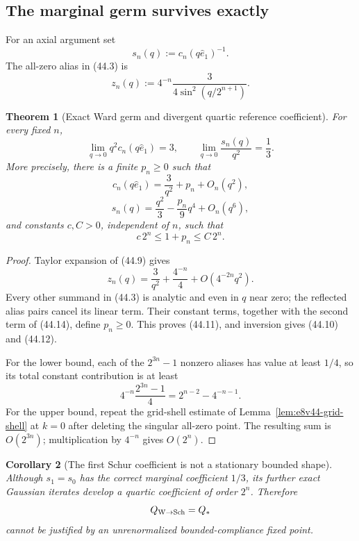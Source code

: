 \documentclass[11pt,oneside]{book}
\newtheorem{theorem}{Theorem}[chapter]
\newtheorem{corollary}[theorem]{Corollary}
\theoremstyle{definition}
\theoremstyle{remark}
\begin{document}
\subsection{The marginal germ survives exactly}

For an axial argument set
\[
 s_n(q):=c_n(q\widehat e_1)^{-1}.                               \tag{44.8}
\]
The all-zero alias in (44.3) is
\[
 z_n(q)
 :=4^{-n}\frac{3}{4\sin^2(q/2^{n+1})}.                         \tag{44.9}
\]

\begin{theorem}[Exact Ward germ and divergent quartic reference
coefficient]
\label{thm:e8v44-Ward-germ}
For every fixed \(n\),
\[
 \boxed{\lim_{q\to0}q^2c_n(q\widehat e_1)=3,\qquad
 \lim_{q\to0}\frac{s_n(q)}{q^2}=\frac13.}                       \tag{44.10}
\]
More precisely, there is a finite \(p_n\ge0\) such that
\[
 c_n(q\widehat e_1)=\frac3{q^2}+p_n+O_n(q^2),                  \tag{44.11}
\]
\[
 s_n(q)=\frac{q^2}{3}-\frac{p_n}{9}q^4+O_n(q^6),               \tag{44.12}
\]
and constants \(c,C>0\), independent of \(n\), such that
\[
 \boxed{c\,2^n\le1+p_n\le C\,2^n.}                             \tag{44.13}
\]
\end{theorem}

\begin{proof}
Taylor expansion of (44.9) gives
\[
 z_n(q)=\frac3{q^2}+\frac{4^{-n}}4+O(4^{-2n}q^2).               \tag{44.14}
\]
Every other summand in (44.3) is analytic and even in \(q\) near
zero; the reflected alias pairs cancel its linear term.  Their
constant terms, together with the second term of (44.14), define
\(p_n\ge0\).  This proves (44.11), and inversion gives
(44.10) and (44.12).

For the lower bound, each of the \(2^{3n}-1\) nonzero aliases has
value at least \(1/4\), so its total constant contribution is at
least
\[
 4^{-n}\frac{2^{3n}-1}{4}
 =2^{n-2}-4^{-n-1}.                                             \tag{44.15}
\]
For the upper bound, repeat the grid-shell estimate of
Lemma~\ref{lem:e8v44-grid-shell} at \(k=0\) after deleting the
singular all-zero point.  The resulting sum is \(O(2^{3n})\);
multiplication by \(4^{-n}\) gives \(O(2^n)\).
\end{proof}

\begin{corollary}[The first Schur coefficient is not a stationary
bounded shape]
\label{cor:e8v44-no-first-fixed}
Although \(s_1=s_0\) has the correct marginal coefficient \(1/3\),
its further exact Gaussian iterates develop a quartic coefficient of
order \(2^n\).  Therefore
\[
 Q_{\rm W\to Sch}=Q_*
\]
cannot be justified by an unrenormalized bounded-compliance fixed
point.
\end{corollary}
\end{document}
